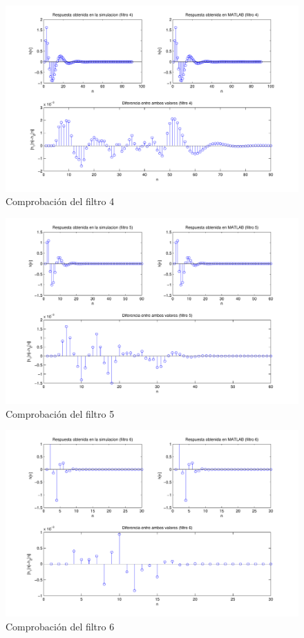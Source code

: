 \documentclass[a4paper,12pt]{report}
\begin{document}
\begin{figure}[hbt]
\includegraphics[width=\textwidth]{img/respfiltro4.pdf} 
\caption{Comprobación del filtro 4} \label{fig:filter4}
\end{figure}

\begin{figure}[hbt]
\includegraphics[width=\textwidth]{img/respfiltro5.pdf} 
\caption{Comprobación del filtro 5} \label{fig:filter5}
\end{figure}

\begin{figure}[hbt]
\includegraphics[width=\textwidth]{img/respfiltro6.pdf} 
\caption{Comprobación del filtro 6} \label{fig:filter6}
\end{figure}
\end{document}
